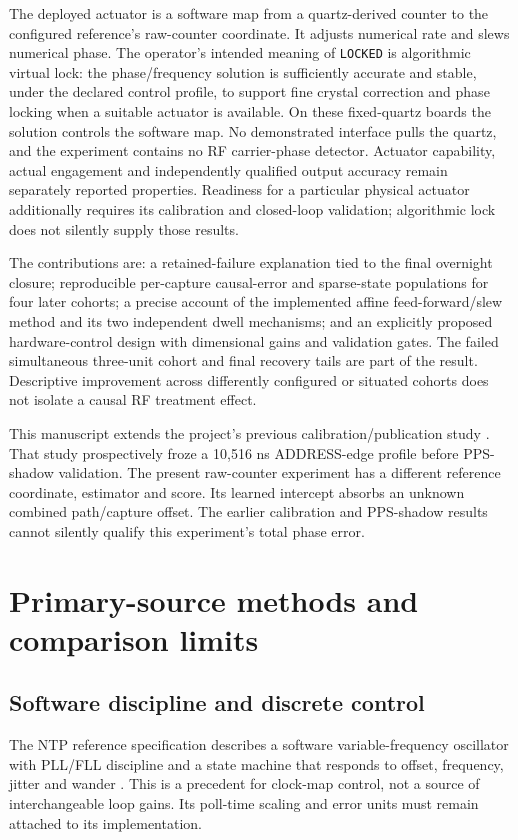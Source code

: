 \documentclass[11pt,letterpaper]{article}
\newcommand{\code}[1]{\texttt{\small #1}}
\begin{document}
The deployed actuator is a software map from a quartz-derived counter to the configured reference's raw-counter coordinate. It adjusts numerical rate and slews numerical phase. The operator's intended meaning of \code{LOCKED} is algorithmic virtual lock: the phase/frequency solution is sufficiently accurate and stable, under the declared control profile, to support fine crystal correction and phase locking when a suitable actuator is available. On these fixed-quartz boards the solution controls the software map. No demonstrated interface pulls the quartz, and the experiment contains no RF carrier-phase detector. Actuator capability, actual engagement and independently qualified output accuracy remain separately reported properties. Readiness for a particular physical actuator additionally requires its calibration and closed-loop validation; algorithmic lock does not silently supply those results.

The contributions are: a retained-failure explanation tied to the final overnight closure; reproducible per-capture causal-error and sparse-state populations for four later cohorts; a precise account of the implemented affine feed-forward/slew method and its two independent dwell mechanisms; and an explicitly proposed hardware-control design with dimensional gains and validation gates. The failed simultaneous three-unit cohort and final recovery tails are part of the result. Descriptive improvement across differently configured or situated cohorts does not isolate a causal RF treatment effect.

This manuscript extends the project's previous calibration/publication study \cite{prior}. That study prospectively froze a 10,516 ns ADDRESS-edge profile before PPS-shadow validation. The present raw-counter experiment has a different reference coordinate, estimator and score. Its learned intercept absorbs an unknown combined path/capture offset. The earlier calibration and PPS-shadow results cannot silently qualify this experiment's total phase error.

\section{Primary-source methods and comparison limits}
\subsection{Software discipline and discrete control}
The NTP reference specification describes a software variable-frequency oscillator with PLL/FLL discipline and a state machine that responds to offset, frequency, jitter and wander \cite{ntp}. This is a precedent for clock-map control, not a source of interchangeable loop gains. Its poll-time scaling and error units must remain attached to its implementation.
\end{document}
